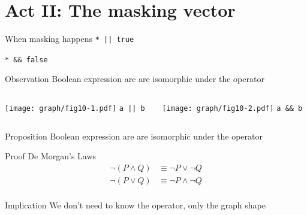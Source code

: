 \documentclass[xcolor = {dvipsnames, table}, aspectratio=169]{beamer}
\begin{document}
\section{Act II: The masking vector}

\begin{frame}[fragile]
    \begin{block}{When masking happens}
        \lstinline{* || true}

        \lstinline{* && false}
    \end{block}
\end{frame}

\begin{frame}[fragile]
    \begin{block}{Observation}
        Boolean expression are are isomorphic under the operator

        \begin{columns}
            \begin{column}{0.4\textwidth}
                \centering
                \texttt{[image: graph/fig10-1.pdf]}
                \lstinline{a || b}
            \end{column}
            \begin{column}{0.4\textwidth}
                \centering
                \texttt{[image: graph/fig10-2.pdf]}
                \lstinline{a && b}
            \end{column}
        \end{columns}
    \end{block}
\end{frame}

\begin{frame}
    \begin{block}{Proposition}
        Boolean expression are are isomorphic under the operator
    \end{block}

    \begin{block}{Proof}
        De Morgan's Laws
        \begin{align*}
            \neg(P \wedge Q) & \equiv \neg P \vee \neg Q \\
            \neg(P \vee Q) & \equiv \neg P \wedge \neg Q \\
        \end{align*}
    \end{block}

    \begin{block}{Implication}
        We don't need to know the operator, only the graph shape
    \end{block}
\end{frame}
\end{document}
